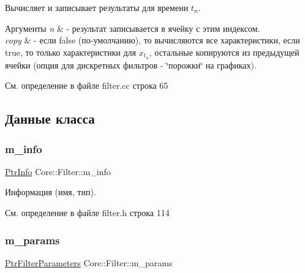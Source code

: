 Вычисляет и записывает результаты для времени $t_n$. 


\begin{DoxyParams}{Аргументы}
{\em n} & -\/ результат записывается в ячейку с этим индексом. \\
\hline
{\em copy} & -\/ если false (по-\/умолчанию), то вычисляются все характеристики, если true, то только характеристики для $x_{t_n}$, остальные копируются из предыдущей ячейки (опция для дискретных фильтров -\/ \char`\"{}порожки\char`\"{} на графиках). \\
\hline
\end{DoxyParams}


См. определение в файле filter.\+cc строка 65



\subsection{Данные класса}
\hypertarget{class_core_1_1_filter_a089304c3d1695bd6b47d5bfd8fcfb574}{}\label{class_core_1_1_filter_a089304c3d1695bd6b47d5bfd8fcfb574} 
\subsubsection{\texorpdfstring{m\+\_\+info}{m\_info}}
{\footnotesize\ttfamily \hyperlink{namespace_core_a647483da8a1266d5bbd3e9bb5cd66d08}{Ptr\+Info} Core\+::\+Filter\+::m\+\_\+info\hspace{0.3cm}{\ttfamily [protected]}}

Информация (имя, тип). 

См. определение в файле filter.\+h строка 114

\hypertarget{class_core_1_1_filter_ae4d42bb0f0e6299d4edbfc310e96d09f}{}\label{class_core_1_1_filter_ae4d42bb0f0e6299d4edbfc310e96d09f} 
\subsubsection{\texorpdfstring{m\+\_\+params}{m\_params}}
{\footnotesize\ttfamily \hyperlink{namespace_core_a4811af8148ba137d644b9a61a042cf03}{Ptr\+Filter\+Parameters} Core\+::\+Filter\+::m\+\_\+params\hspace{0.3cm}{\ttfamily [protected]}}

